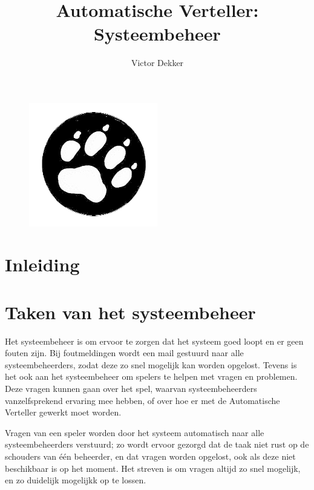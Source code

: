 \documentclass[12pt]{article}
\author{Victor Dekker}
\title{Automatische Verteller:\\Systeembeheer}
\begin{document}

\maketitle

\begin{figure}[h!]
  \centering
  \includegraphics[width=0.5\textwidth]{Welp2.png}
\end{figure}

\newpage
\tableofcontents
\newpage

\section{Inleiding}

  
  
\section{Taken van het systeembeheer}

  Het systeembeheer is om ervoor te zorgen dat het systeem goed loopt en er geen fouten zijn. Bij foutmeldingen wordt een mail gestuurd naar alle systeembeheerders, zodat deze zo snel mogelijk kan worden opgelost. Tevens is het ook aan het systeembeheer om spelers te helpen met vragen en problemen. Deze vragen kunnen gaan over het spel, waarvan systeembeheerders vanzelfsprekend ervaring mee hebben, of over hoe er met de Automatische Verteller gewerkt moet worden.
  
  Vragen van een speler worden door het systeem automatisch naar alle systeembeheerders verstuurd; zo wordt ervoor gezorgd dat de taak niet rust op de schouders van \'e\'en beheerder, en dat vragen worden opgelost, ook als deze niet beschikbaar is op het moment. Het streven is om vragen altijd zo snel mogelijk, en zo duidelijk mogelijkk op te lossen.
  
\end{document}
